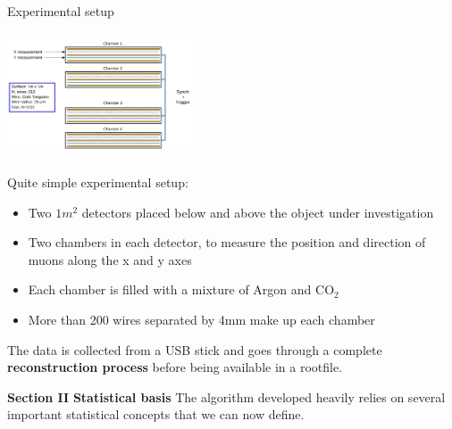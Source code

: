 \documentclass[8 pt]{beamer}
\begin{document}
\begin{frame}{Experimental setup}
\begin{minipage}[c]{.50\textwidth}
\includegraphics[width=5.5cm, height=3.7cm]{figs/muonChambers.png}
\end{minipage} \hfill
\begin{minipage}[c]{.49\textwidth}
\justifying
Quite simple experimental setup:
\begin{itemize}
\justifying
\item Two $1m^2$ detectors placed below and above the object under investigation
\item Two chambers in each detector, to measure the position and direction of muons along the x and y axes
\item Each chamber is filled with a mixture of Argon and CO$_2$
\item More than 200 wires separated by 4mm make up each chamber
\end{itemize}
\end{minipage} \hfill  \vfill

The data is collected from a USB stick and goes through a complete \textbf{\alert{reconstruction process}} before being available in a rootfile. \vfill
\end{frame}








\begin{frame}{}
\centering
	\huge{\textbf{\color{mycolor} Section II}} \newline
	\LARGE{\textbf{\color{mycolor} Statistical basis \color{black}}} \vfill
The algorithm developed heavily relies on several important statistical concepts that we can now define. \vfill
\end{frame}
\end{document}
